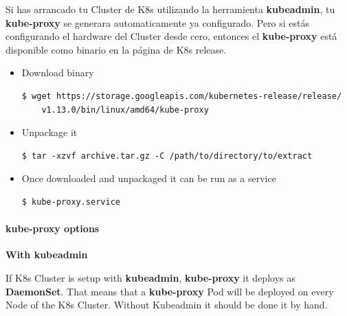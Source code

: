 \documentclass{article}
\newenvironment{blocktemplateI}[1]{%
    \tcolorbox[beamer,%
    noparskip,breakable,
    colframe=Violet,%
    colbacklower=Black,%
    title=#1]}%
    {\endtcolorbox}
\newenvironment{codetemplate}[1][]{%
  \mybasecolorbox[#1]
  \itshape
}{%
  \endmybasecolorbox
}
\begin{document}
Si has arrancado tu Cluster de K8s utilizando la herramienta \textbf{kubeadmin}, tu \textbf{kube-proxy} se generara automaticamente ya configurado. Pero si estás configurando el hardware del Cluster desde cero, entonces el \textbf{kube-proxy} está disponible como binario en la página de K8s release.

\begin{itemize}
    \item Download binary
\begin{codetemplate}{}
\begin{verbatim}
$ wget https://storage.googleapis.com/kubernetes-release/release/
    v1.13.0/bin/linux/amd64/kube-proxy
\end{verbatim}
\end{codetemplate}

    \item Unpackage it
\begin{codetemplate}{}
\begin{verbatim}
$ tar -xzvf archive.tar.gz -C /path/to/directory/to/extract
\end{verbatim}
\end{codetemplate} 

    \item Once downloaded and unpackaged it can be run as a service
\begin{codetemplate}{}
\begin{verbatim}
$ kube-proxy.service
\end{verbatim}
\end{codetemplate}
\end{itemize}

\paragraph{kube-proxy options}

\textbf{With kubeadmin}

\begin{blocktemplateI} {Note}
If K8s Cluster is setup with \textbf{kubeadmin}, \textbf{kube-proxy} it deploys as \textbf{DaemonSet}. That means that a \textbf{kube-proxy} Pod will be deployed on every Node of the K8s Cluster. Without Kubeadmin it should be done it by hand.
\end{blocktemplateI}
\end{document}
